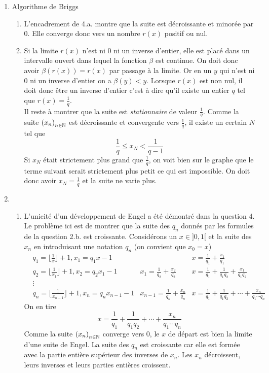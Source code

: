 \begin{enumerate}
\item Algorithme de Briggs
\begin{enumerate}
 \item L'encadrement de 4.a. montre que la suite est décroissante et minorée par $0$. Elle converge donc vers un nombre $r(x)$ positif ou nul.
\item Si la limite $r(x)$ n'est ni $0$ ni un inverse d'entier, elle est placé dans un intervalle ouvert dans lequel la fonction $\beta$ est continue. On doit donc avoir $\beta(r(x))=r(x)$ par passage à la limite. Or en un $y$ qui n'est ni $0$ ni un inverse d'entier on a $\beta(y)<y$. Lorsque $r(x)$ est non nul, il doit donc être un inverse d'entier c'est à dire qu'il existe un entier $q$ tel que $r(x)=\frac{1}{q}$.\\
Il reste à montrer que la suite est \emph{stationnaire} de valeur $\frac{1}{q}$. Comme la suite $\left( x_n\right) _{n\in \mathbb{N}}$ est décroissante et convergente vers $\frac{1}{q}$, il existe un certain $N$ tel que 
\begin{displaymath}
 \frac{1}{q}\leq x_N <\frac{1}{q-1} 
\end{displaymath}
Si $x_N$ était strictement plus grand que $\frac{1}{q}$, on voit bien sur le graphe que le terme suivant serait strictement plus petit ce qui est impossible. On doit donc avoir $x_N=\frac{1}{q}$ et la suite ne varie plus.
\end{enumerate}

\item \begin{enumerate}
 \item L'unicité d'un développement de Engel a été démontré dans la question 4. Le problème ici est de montrer que la suite des $q_n$ donnés par les formules de la question 2.b. est croissante. Considérons un $x\in ]0,1[$ et la suite des $x_n$ en introduisant une notation $q_n$ (on convient que $x_0=x$)
\begin{align*}
&q_1 = \lfloor \frac{1}{x}\rfloor +1,x_1 = q_1 x - 1     &  &x = \frac{1}{q_1} + \frac{x_1}{q_1} \\
&q_2 = \lfloor \frac{1}{x_1}\rfloor +1,x_2 = q_2 x_1 - 1 &x_1 = \frac{1}{q_2} + \frac{x_2}{q_2}& x = \frac{1}{q_1} + \frac{1}{q_1q_2} + \frac{x_1}{q_1q_2} \\
 &  \vdots &  &\\
&q_n = \lfloor \frac{1}{x_{n-1}}\rfloor +1,x_n = q_n x_{n-1} - 1 &x_{n-1} = \frac{1}{q_n} + \frac{x_n}{q_n}& x = \frac{1}{q_1} + \frac{1}{q_1q_2} + \cdots +\frac{x_n}{q_1\cdots q_n}
\end{align*}
On en tire
\begin{displaymath}
x = \frac{1}{q_1} + \frac{1}{q_1q_2} + \cdots +\frac{x_n}{q_1\cdots q_n}  
\end{displaymath}
Comme la suite $\left( x_n\right)_{n\in \mathbb{N}}$ converge vers $0$, le $x$ de départ est bien la limite d'une suite de Engel. La suite des $q_n$ est croissante car elle est formée avec la partie entière supérieur des inverses de $x_n$. Les $x_n$ décroissent, leurs inverses et leurs parties entières croissent.
 

\end{enumerate}
\end{enumerate}

